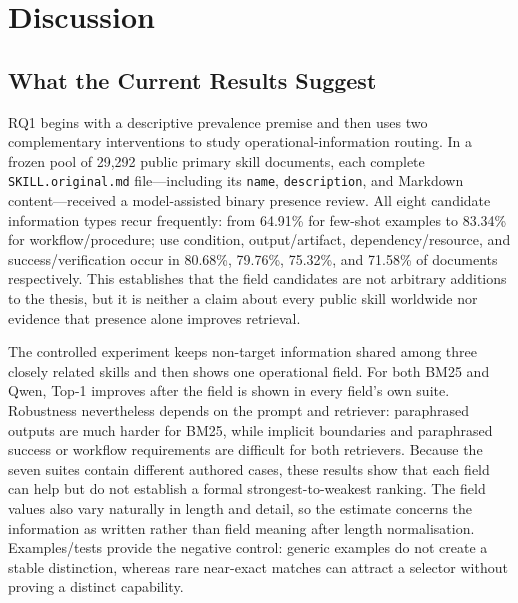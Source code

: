 \chapter{Discussion}

\section{What the Current Results Suggest}

RQ1 begins with a descriptive prevalence premise and then uses two complementary interventions to study operational-information routing. In a frozen pool of 29,292 public primary skill documents, each complete \texttt{SKILL.original.md} file---including its \texttt{name}, \texttt{description}, and Markdown content---received a model-assisted binary presence review. All eight candidate information types recur frequently: from 64.91\% for few-shot examples to 83.34\% for workflow/procedure; use condition, output/artifact, dependency/resource, and success/verification occur in 80.68\%, 79.76\%, 75.32\%, and 71.58\% of documents respectively. This establishes that the field candidates are not arbitrary additions to the thesis, but it is neither a claim about every public skill worldwide nor evidence that presence alone improves retrieval.

The controlled experiment keeps non-target information shared among three closely related skills and then shows one operational field. For both BM25 and Qwen, Top-1 improves after the field is shown in every field's own suite. Robustness nevertheless depends on the prompt and retriever: paraphrased outputs are much harder for BM25, while implicit boundaries and paraphrased success or workflow requirements are difficult for both retrievers. Because the seven suites contain different authored cases, these results show that each field can help but do not establish a formal strongest-to-weakest ranking. The field values also vary naturally in length and detail, so the estimate concerns the information as written rather than field meaning after length normalisation. Examples/tests provide the negative control: generic examples do not create a stable distinction, whereas rare near-exact matches can attract a selector without proving a distinct capability.

